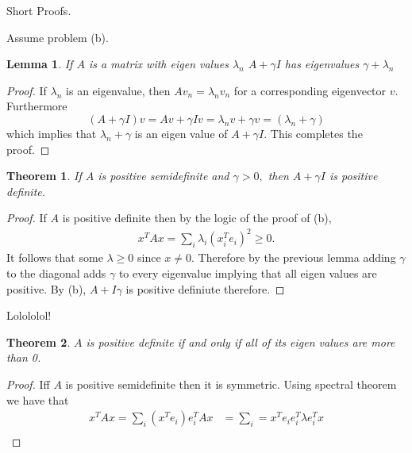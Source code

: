 \documentclass[letter]{article}
\newtheorem{theorem}{Theorem}
\newtheorem{lemma}{Lemma}
\newenvironment{menumerate}{%
  \edef\backupindent{\the\parindent}%
  \enumerate%
  \setlength{\parindent}{\backupindent}%
}{\endenumerate}
\begin{document}
\begin{menumerate}
  \item Short Proofs. 
  \begin{menumerate}
    \item Assume problem (b).
    \begin{lemma}
      If $A$ is a matrix with eigen values $\lambda_n$  $A + \gamma I$ has eigenvalues $\gamma + \lambda_n$   
    \end{lemma}
    \begin{proof}
      If $\lambda_n$ is an eigenvalue, then $Av_n = \lambda_n v_n$  for a corresponding eigenvector $v.$
      Furthermore 
      \begin{equation}
       (A + \gamma I)v = Av + \gamma I v = \lambda_n v + \gamma v = (\lambda_n + \gamma)
       \end{equation} 
       which implies that $\lambda_n + \gamma$ is an eigen value of $A + \gamma I.$ This completes the proof.  
    \end{proof}
    \begin{theorem}
      If $A$ is positive semidefinite and $\gamma > 0,$ then $A + \gamma I$ is positive definite.
    \end{theorem}
    \begin{proof}
      If $A$ is positive definite then by the logic of the proof of (b), 
      \begin{equation}
          \begin{aligned}
            x^T A x = \sum_i \lambda_i (x_i^T e_i)^2 \geq 0.         
          \end{aligned}
         \end{equation}   
      It follows that some $\lambda \geq 0$ since $x \neq 0.$ Therefore by the previous lemma adding 
      $\gamma$ to the diagonal adds $\gamma$ to every eigenvalue implying that all eigen values are positive.
      By (b), $A + I\gamma$ is positive definiute therefore.
      \end{proof}
    \item Lolololol!
    \begin{theorem}
      $A$ is positive definite if and only if all of its eigen values are more than 0.
    \end{theorem}
    \begin{proof}
      Iff $A$ is positive semidefinite then it is symmetric. Using spectral theorem we have that 
      \begin{equation}
        \begin{aligned}
          x^TAx = \sum_i (x^Te_i)e_i^TAx &= \sum_i = x^Te_ie_i^T\lambda e_i^Tx \\

\end{aligned}
\end{equation}
\end{proof}
\end{menumerate}
\end{menumerate}
\end{document}
